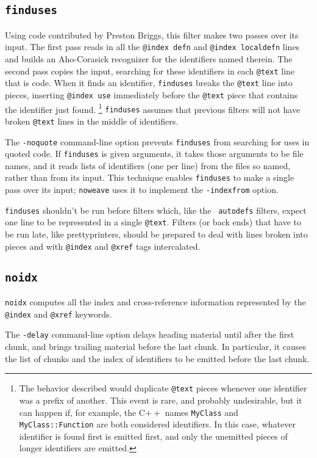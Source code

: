 \documentclass{article}
\makeatletter
\newcommand\kw[1]{\texttt{@#1}}
\newcommand\ikw[1]{\kw{index~#1}}
\newcommand\ltxlabel{\relax}
\let\ltxlabel=\label
\renewcommand\label{{\rm\it label\/}}
\makeatother
\begin{document}
\subsection{\tt finduses}

\ltxlabel{finduses}

Using code contributed by Preston Briggs, this filter makes two passes
over its input.
The first pass reads in all the \ikw{defn} and \ikw{localdefn} lines and builds an
Aho-Corasick recognizer for the identifiers named therein.
The second pass copies the input, searching for these identifiers in
each \kw{text} line that is code.
When it finds an identifier, {\tt finduses} breaks the \kw{text} line
into pieces, inserting \ikw{use} immediately before the \kw{text}
piece that contains the identifier just found.%
\footnote{The behavior described would duplicate \kw{text} pieces
whenever one identifier was a prefix of another.
This event is rare, and probably undesirable, but it can happen if,
for example, the C$++$ names {\tt MyClass} and {\tt MyClass::Function}
are both considered identifiers.
In this case, whatever identifier is found first is emitted first, and
only the unemitted pieces of longer identifiers are emitted.}
{\tt finduses} assumes that previous filters will not have broken
\kw{text} lines in the middle of identifiers.


The \verb+-noquote+ command-line option prevents {\tt finduses} from
searching for uses in quoted code.
If {\tt finduses} is given arguments, it takes those arguments to be
file names, and it reads lists of identifiers (one per line) from the
files so named, rather than from its input.
This technique enables {\tt finduses} to make a single pass over its
input; {\tt noweave} uses it to implement the {\tt -indexfrom} option.

{\tt finduses} shouldn't be run before filters which, like the {\tt
autodefs} filters, expect one line to be represented in a single
\kw{text}.
Filters (or back ends) that have to be run late, like 
prettyprinters, should be prepared to deal with lines broken into
pieces and with \kw{index} and \kw{xref} tags intercalated.

\subsection{\tt noidx}

{\tt noidx} computes all the index and cross-reference information
represented by the \kw{index} and \kw{xref} keywords.

The {\tt -delay} command-line option delays heading material until
after the first chunk, and brings trailing material before the last
chunk.
In particular, it causes
the list of chunks and the index of identifiers to be emitted before
the last chunk.
\end{document}
